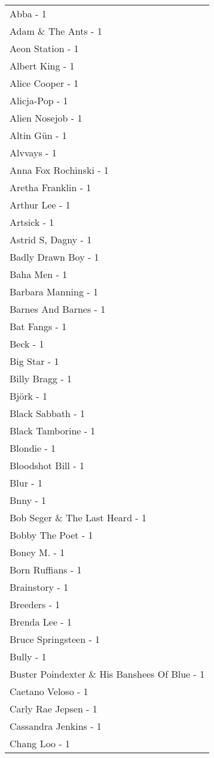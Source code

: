 \documentclass[
]{article}
\begin{document}
\begin{longtable}{l}
Abba - 1 \\ 
Adam \& The Ants - 1 \\ 
Aeon Station - 1 \\ 
Albert King - 1 \\ 
Alice Cooper - 1 \\ 
Alicja-Pop - 1 \\ 
Alien Nosejob - 1 \\ 
Altin Gün - 1 \\ 
Alvvays - 1 \\ 
Anna Fox Rochinski - 1 \\ 
Aretha Franklin - 1 \\ 
Arthur Lee - 1 \\ 
Artsick - 1 \\ 
Astrid S, Dagny - 1 \\ 
Badly Drawn Boy - 1 \\ 
Baha Men - 1 \\ 
Barbara Manning - 1 \\ 
Barnes And Barnes - 1 \\ 
Bat Fangs - 1 \\ 
Beck - 1 \\ 
Big Star - 1 \\ 
Billy Bragg - 1 \\ 
Björk - 1 \\ 
Black Sabbath - 1 \\ 
Black Tamborine - 1 \\ 
Blondie - 1 \\ 
Bloodshot Bill - 1 \\ 
Blur - 1 \\ 
Bnny - 1 \\ 
Bob Seger \& The Last Heard - 1 \\ 
Bobby The Poet - 1 \\ 
Boney M. - 1 \\ 
Born Ruffians - 1 \\ 
Brainstory - 1 \\ 
Breeders - 1 \\ 
Brenda Lee - 1 \\ 
Bruce Springsteen - 1 \\ 
Bully - 1 \\ 
Buster Poindexter \& His Banshees Of Blue - 1 \\ 
Caetano Veloso - 1 \\ 
Carly Rae Jepsen - 1 \\ 
Cassandra Jenkins - 1 \\ 
Chang Loo - 1 \\ 

\end{longtable}
\end{document}
